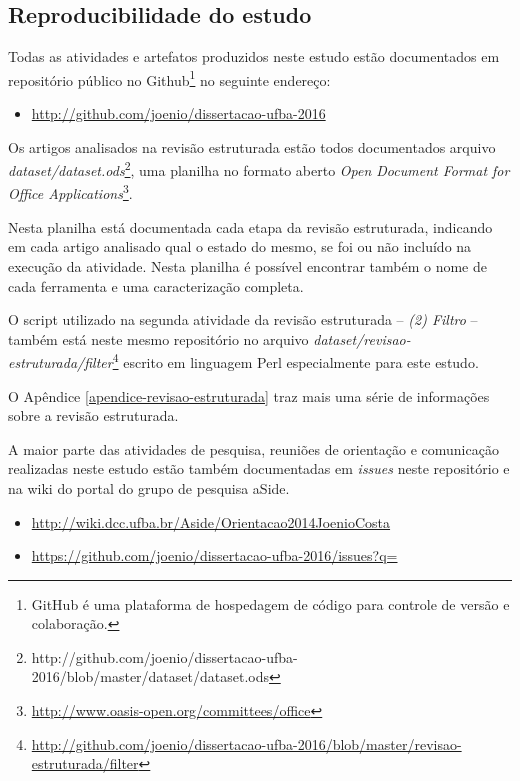 \subsection{Reproducibilidade do estudo}

Todas as atividades e artefatos produzidos neste estudo estão documentados em
repositório público no Github\footnote{GitHub é uma plataforma de hospedagem de
código para controle de versão e colaboração.} no seguinte endereço:

\begin{itemize}
  \item \url{http://github.com/joenio/dissertacao-ufba-2016}
\end{itemize}

Os artigos analisados na revisão estruturada estão todos documentados arquivo
{\it
dataset/dataset.ods}\footnote{http://github.com/joenio/dissertacao-ufba-2016/blob/master/dataset/dataset.ods},
uma planilha no formato aberto {\it Open Document Format for Office
Applications}\footnote{\url{http://www.oasis-open.org/committees/office}}.

Nesta planilha está documentada cada etapa da revisão estruturada, indicando em
cada artigo analisado qual o estado do mesmo, se foi ou não incluído na
execução da atividade.  Nesta planilha é possível encontrar também o nome de
cada ferramenta e uma caracterização completa.

O script utilizado na segunda atividade da revisão estruturada -- {\it (2)
Filtro} -- também está neste mesmo repositório no arquivo {\it
dataset/revisao-estruturada/filter}\footnote{\url{http://github.com/joenio/dissertacao-ufba-2016/blob/master/revisao-estruturada/filter}}
escrito em linguagem Perl especialmente para este estudo.

O Apêndice \ref{apendice-revisao-estruturada} traz mais uma série de informações sobre a revisão estruturada.

A maior parte das atividades de pesquisa, reuniões de orientação e comunicação
realizadas neste estudo estão também documentadas em {\it issues} neste
repositório e na wiki do portal do grupo de pesquisa aSide.

\begin{itemize}
  \item \url{http://wiki.dcc.ufba.br/Aside/Orientacao2014JoenioCosta}
  \item \url{https://github.com/joenio/dissertacao-ufba-2016/issues?q=}
\end{itemize}
